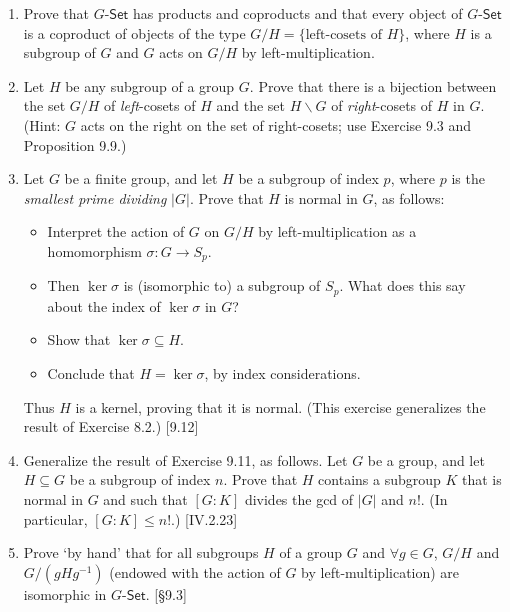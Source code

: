 \begin{enumerate}
      \item Prove that $G$-$\mathsf{Set}$ has products and coproducts and that every object of $G$-$\mathsf{Set}$ is a coproduct of objects of the type $G/H = \{\text{left-cosets of } H\}$, where $H$ is a subgroup of $G$ and $G$ acts on $G/H$ by left-multiplication.

      \item Let $H$ be any subgroup of a group $G$. Prove that there is a bijection between the set $G/H$ of \emph{left}-cosets of $H$ and the set $H \backslash G$ of \emph{right}-cosets of $H$ in $G$. (Hint: $G$ acts on the right on the set of right-cosets; use Exercise 9.3 and Proposition 9.9.)

      \item Let $G$ be a finite group, and let $H$ be a subgroup of index $p$, where $p$ is the \emph{smallest prime dividing} $|G|$. Prove that $H$ is normal in $G$, as follows:
            \begin{itemize}
                  \item Interpret the action of $G$ on $G/H$ by left-multiplication as a homomorphism $\sigma: G \to S_p$.
                  \item Then $\ker\sigma$ is (isomorphic to) a subgroup of $S_p$. What does this say about the index of $\ker\sigma$ in $G$?
                  \item Show that $\ker\sigma \subseteq H$.
                  \item Conclude that $H = \ker\sigma$, by index considerations.
            \end{itemize}
            Thus $H$ is a kernel, proving that it is normal. (This exercise generalizes the result of Exercise 8.2.) [9.12]

      \item Generalize the result of Exercise 9.11, as follows. Let $G$ be a group, and let $H \subseteq G$ be a subgroup of index $n$. Prove that $H$ contains a subgroup $K$ that is normal in $G$ and such that $[G: K]$ divides the gcd of $|G|$ and $n!$. (In particular, $[G: K] \le n!$.) [IV.2.23]

      \item Prove `by hand' that for all subgroups $H$ of a group $G$ and $\forall g \in G$, $G/H$ and $G/(gHg^{-1})$ (endowed with the action of $G$ by left-multiplication) are isomorphic in $G$-$\mathsf{Set}$. [\S9.3]


\end{enumerate}
